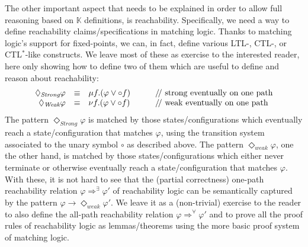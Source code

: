 \documentclass[UTF8,11pt]{article}
\theoremstyle{plain}
\theoremstyle{definition}
\theoremstyle{remark}
\newcommand{\K}{\mbox{$\mathbb{K}$}\xspace}
\newcommand{\doubleslash}{/\!/{ }}
\begin{document}
The other important aspect that needs to be explained in order to allow
full reasoning based on \K definitions, is reachability.
Specifically, we need a way to define reachability claims/specifications
in matching logic.
Thanks to matching logic's support for fixed-points, we can, in fact,
define various LTL-, CTL-, or CTL$^*$-like constructs.
We leave most of these as exercise to the interested reader,
here only showing how to define two of them which are useful to define
and reason about reachability:
$$
\begin{array}{rcl@{\hspace*{7ex}}l}
\Diamond_{\textit{Strong}} \varphi & \equiv & \mu f . (\varphi \vee \circ f)
& \textrm{\doubleslash strong eventually on one path}
\\
\Diamond_{\textit{Weak}} \varphi & \equiv & \nu f . (\varphi \vee \circ f)
& \textrm{\doubleslash weak eventually on one path}
\end{array}
$$
The pattern $\Diamond_{\textit{Strong}}\varphi$ is matched by those
states/configurations which eventually reach a state/configuration that
matches $\varphi$, using the transition system associated to the unary
symbol $\circ$ as described above.
The pattern $\Diamond_{\textit{weak}}\varphi$, one the other hand, is matched
by those states/configurations which either never terminate or otherwise
eventually reach a state/configuration that matches $\varphi$.
With these, it is not hard to see that the (partial correctness) one-path
reachability relation $\varphi \Rightarrow^\exists \varphi'$ of reachability
logic \cite{stefanescu-park-yuwen-li-rosu-2016-oopsla} can be semantically
captured by the pattern
$\varphi \rightarrow \Diamond_{\textit{weak}}\varphi'$.
We leave it as a (non-trivial) exercise to the reader to also define the
all-path reachability relation $\varphi \Rightarrow^\forall\varphi'$ and to
prove all the proof rules of reachability logic as lemmas/theorems using the
more basic proof system of matching logic.
\end{document}
